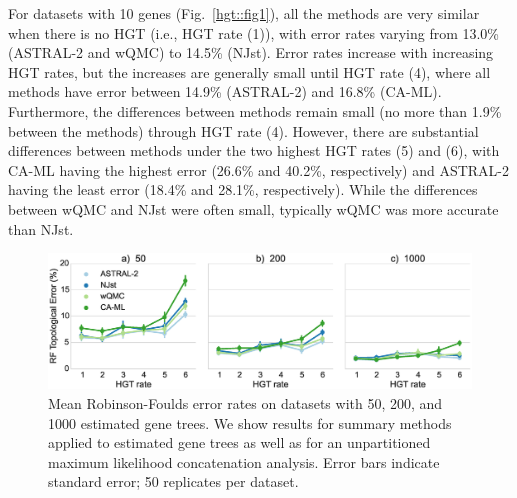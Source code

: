 For datasets with 10 genes (Fig.~\ref{hgt::fig1}), %
 all the methods are very similar when there is no HGT (i.e., HGT rate (1)), with error rates varying from 13.0\% (ASTRAL-2 and wQMC) to 14.5\% (NJst). Error rates increase with increasing HGT rates, but the increases
are generally small until HGT rate (4), where all methods have error between 14.9\%  (ASTRAL-2) and
16.8\% (CA-ML).   Furthermore,  the differences between methods remain small (no more than 1.9\% between the methods) through HGT rate (4).  However, there are substantial differences between methods under the two highest HGT rates (5) and (6),  with CA-ML having the highest error (26.6\% and 40.2\%, respectively) and ASTRAL-2 having the least error (18.4\% and 28.1\%, respectively). While the differences between wQMC and NJst were often small, typically wQMC was more accurate than NJst. 

  \begin{figure}[h!]
 \includegraphics[width=\textwidth]{hgt-figs/more-est-row.eps}
 \caption[Mean Robinson-Foulds error rates on 
datasets with 50, 200, and 1000 estimated gene trees]{{Mean Robinson-Foulds error rates on 
datasets with 50, 200, and 1000 estimated gene trees. }
We show results for summary methods 
applied to estimated gene trees as well as for an unpartitioned
maximum likelihood
concatenation analysis. Error bars indicate standard error; 
50 replicates per dataset. }
\label{hgt::fig2}
      \end{figure}

